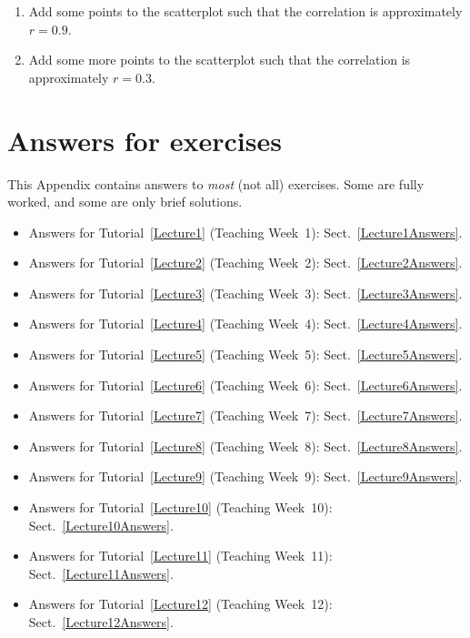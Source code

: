 \documentclass[
  11pt,
  a4paper,
  krantz2]{krantz}
\providecommand{\tightlist}{%
  \setlength{\itemsep}{0pt}\setlength{\parskip}{0pt}}
\newlength{\greyboxheight}
\newcommand{\setgreyboxheight}[1]{%
  \setlength{\greyboxheight}{2.3\baselineskip * #1}%
}
\newenvironment{greybox}[1]{%
  \nopagebreak
  \setgreyboxheight{#1}%
  \begin{tcolorbox}[
    colframe=gray!30!black,
    boxrule=2pt,
    width=\linewidth,
    height=\greyboxheight,
    valign=center,
    colback=white,
    left=4pt,
    right=4pt, 
    top=4pt, 
    bottom=4pt,
    before skip=4pt,
    after skip=4pt
  ]
\vspace*{\greyboxheight} %
}{%
  \end{tcolorbox}
  \goodbreak
}
\newcommand{\answerbox}[1]{\noindent\begin{greybox}{#1}\end{greybox}}
\begin{document}
\begin{enumerate}
\def\labelenumi{\arabic{enumi}.}
\tightlist
\item
  Add some points to the scatterplot such that the correlation is approximately \(r = 0.9\).
  \answerbox{5}
\item
  Add some more points to the scatterplot such that the correlation is approximately \(r = 0.3\).
  \answerbox{5}
\end{enumerate}

\appendix {}


\chapter{Answers for exercises}\label{OptionalAnswers}

This Appendix contains answers to \emph{most} (not all) exercises.
Some are fully worked, and some are only brief solutions.

\begin{itemize}
\tightlist
\item
  Answers for Tutorial~\ref{Lecture1} (Teaching Week~1): Sect.~\ref{Lecture1Answers}.
\item
  Answers for Tutorial~\ref{Lecture2} (Teaching Week~2): Sect.~\ref{Lecture2Answers}.
\item
  Answers for Tutorial~\ref{Lecture3} (Teaching Week~3): Sect.~\ref{Lecture3Answers}.
\item
  Answers for Tutorial~\ref{Lecture4} (Teaching Week~4): Sect.~\ref{Lecture4Answers}.
\item
  Answers for Tutorial~\ref{Lecture5} (Teaching Week~5): Sect.~\ref{Lecture5Answers}.
\item
  Answers for Tutorial~\ref{Lecture6} (Teaching Week~6): Sect.~\ref{Lecture6Answers}.
\item
  Answers for Tutorial~\ref{Lecture7} (Teaching Week~7): Sect.~\ref{Lecture7Answers}.
\item
  Answers for Tutorial~\ref{Lecture8} (Teaching Week~8): Sect.~\ref{Lecture8Answers}.
\item
  Answers for Tutorial~\ref{Lecture9} (Teaching Week~9): Sect.~\ref{Lecture9Answers}.
\item
  Answers for Tutorial~\ref{Lecture10} (Teaching Week~10): Sect.~\ref{Lecture10Answers}.
\item
  Answers for Tutorial~\ref{Lecture11} (Teaching Week~11): Sect.~\ref{Lecture11Answers}.
\item
  Answers for Tutorial~\ref{Lecture12} (Teaching Week~12): Sect.~\ref{Lecture12Answers}.
\end{itemize}
\end{document}
